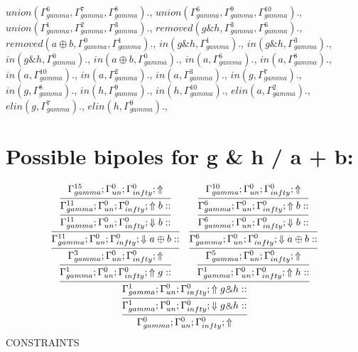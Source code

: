 \documentclass[a4paper, 11pt]{article}
\begin{document}
$union(\Gamma_{gamma}^{6}, \Gamma_{gamma}^{7}, \Gamma_{gamma}^{8}).$, $union(\Gamma_{gamma}^{6}, \Gamma_{gamma}^{9}, \Gamma_{gamma}^{10}).$, $union(\Gamma_{gamma}^{1}, \Gamma_{gamma}^{2}, \Gamma_{gamma}^{3}).$, $removed(g \binampersand h, \Gamma_{gamma}^{3}, \Gamma_{gamma}^{6}).$, $removed(a \oplus b, \Gamma_{gamma}^{0}, \Gamma_{gamma}^{1}).$, $in(g \binampersand h, \Gamma_{gamma}^{1}).$, $in(g \binampersand h, \Gamma_{gamma}^{3}).$, $in(g \binampersand h, \Gamma_{gamma}^{0}).$, $in(a \oplus b, \Gamma_{gamma}^{0}).$, $in(a, \Gamma_{gamma}^{6}).$, $in(a, \Gamma_{gamma}^{8}).$, $in(a, \Gamma_{gamma}^{10}).$, $in(a, \Gamma_{gamma}^{2}).$, $in(a, \Gamma_{gamma}^{3}).$, $in(g, \Gamma_{gamma}^{7}).$, $in(g, \Gamma_{gamma}^{8}).$, $in(h, \Gamma_{gamma}^{9}).$, $in(h, \Gamma_{gamma}^{10}).$, $elin(a, \Gamma_{gamma}^{2}).$, $elin(g, \Gamma_{gamma}^{7}).$, $elin(h, \Gamma_{gamma}^{9}).$, 
\section{Possible bipoles for g \& h / a + b:} 

\[
\infer{\Gamma_{ gamma}^{0} ; \Gamma_{un}^{0} ; \Gamma_{ infty}^{0} ;  \Uparrow }
{\infer{\Gamma_{ gamma}^{1} ; \Gamma_{un}^{0} ; \Gamma_{ infty}^{0} ;  \Downarrow g \binampersand h :: }
{\infer{\Gamma_{ gamma}^{1} ; \Gamma_{un}^{0} ; \Gamma_{ infty}^{0} ;  \Uparrow g \binampersand h :: }
{\infer{\Gamma_{ gamma}^{1} ; \Gamma_{un}^{0} ; \Gamma_{ infty}^{0} ;  \Uparrow g :: }
{\infer{\Gamma_{ gamma}^{3} ; \Gamma_{un}^{0} ; \Gamma_{ infty}^{0} ;  \Uparrow }
{\infer{\Gamma_{ gamma}^{11} ; \Gamma_{un}^{0} ; \Gamma_{ infty}^{0} ;  \Downarrow a \oplus b :: }
{\infer{\Gamma_{ gamma}^{11} ; \Gamma_{un}^{0} ; \Gamma_{ infty}^{0} ;  \Downarrow b :: }
{\infer{\Gamma_{ gamma}^{11} ; \Gamma_{un}^{0} ; \Gamma_{ infty}^{0} ;  \Uparrow b :: }
{\Gamma_{ gamma}^{15} ; \Gamma_{un}^{0} ; \Gamma_{ infty}^{0} ;  \Uparrow }}}}}
&
\infer{\Gamma_{ gamma}^{1} ; \Gamma_{un}^{0} ; \Gamma_{ infty}^{0} ;  \Uparrow h :: }
{\infer{\Gamma_{ gamma}^{5} ; \Gamma_{un}^{0} ; \Gamma_{ infty}^{0} ;  \Uparrow }
{\infer{\Gamma_{ gamma}^{6} ; \Gamma_{un}^{0} ; \Gamma_{ infty}^{0} ;  \Downarrow a \oplus b :: }
{\infer{\Gamma_{ gamma}^{6} ; \Gamma_{un}^{0} ; \Gamma_{ infty}^{0} ;  \Downarrow b :: }
{\infer{\Gamma_{ gamma}^{6} ; \Gamma_{un}^{0} ; \Gamma_{ infty}^{0} ;  \Uparrow b :: }
{\Gamma_{ gamma}^{10} ; \Gamma_{un}^{0} ; \Gamma_{ infty}^{0} ;  \Uparrow }}}}}}}}
\]
CONSTRAINTS
\end{document}

